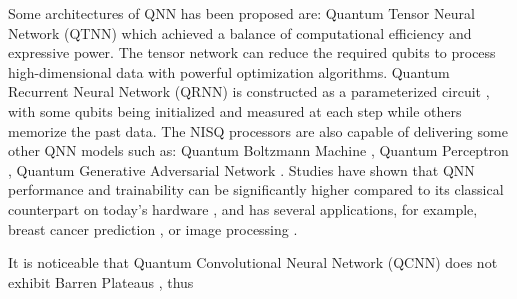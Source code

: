 Some architectures of QNN has been proposed are: 
Quantum Tensor Neural Network (QTNN) \cite{hugginsQuantumMachineLearning2019} which achieved a balance of computational efficiency and expressive power. 
The tensor network can reduce the required qubits to process high-dimensional data with powerful optimization algorithms.
Quantum Recurrent Neural Network (QRNN) is constructed as a parameterized circuit \cite{takakiLearningTemporalData2021}, with some qubits being initialized and measured at each step while others memorize the past data.
The NISQ processors are also capable of delivering some other QNN models such as: 
Quantum Boltzmann Machine \cite{shinguBoltzmannMachineLearning2021, zoufalVariationalQuantumBoltzmann2021}, 
Quantum Perceptron \cite{kristensenArtificialSpikingQuantum2021}, 
Quantum Generative Adversarial Network \cite{dallaire-demersQuantumGenerativeAdversarial2018, lloydQuantumGenerativeAdversarial2018}. Studies have shown that QNN performance and trainability can be significantly higher compared to its classical counterpart on today's hardware \cite{abbasPowerQuantumNeural2021, colesSeekingQuantumAdvantage2021}, and has several applications, for example, breast cancer prediction \cite{liModelAlgorithmQuantuminspired2014}, or image processing \cite{matsuiQubitNeuralNetwork2009}.

It is noticeable that Quantum Convolutional Neural Network (QCNN) does not exhibit Barren Plateaus \cite{pesahAbsenceBarrenPlateaus2021}, thus 